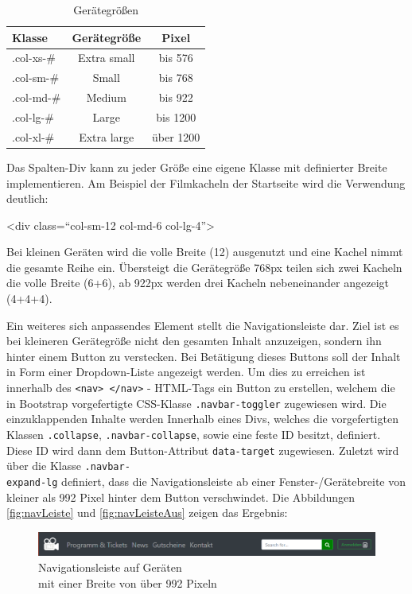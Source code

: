 	\begin{table}[H]
		\centering
		\begin{tabular}{p{} | c | c }
			\textbf{Klasse} & \textbf{Gerätegröße} & \textbf{Pixel} \\\toprule
			.col-xs-\# &  Extra small &  bis 576 \\
			.col-sm-\# &  Small &  bis 768  \\
			.col-md-\# &  Medium &  bis 922  \\
			.col-lg-\# &  Large &  bis 1200  \\
			.col-xl-\# &  Extra large &  über 1200  \\
		\end{tabular}
		\caption[Gerätegrößen]{\label{tab:gerätegrößen}Gerätegrößen }
	\end{table}
	
	Das Spalten-Div kann zu jeder Größe eine eigene Klasse mit definierter Breite implementieren. Am Beispiel der Filmkacheln der Startseite wird die Verwendung deutlich:
		\begin{center}
			<div class=“col-sm-12 col-md-6 col-lg-4”>
		\end{center}

	Bei kleinen Geräten wird die volle Breite (12) ausgenutzt und eine Kachel nimmt die gesamte Reihe ein. Übersteigt die Gerätegröße 768px teilen sich zwei Kacheln die volle Breite (6+6), ab 922px werden drei Kacheln nebeneinander angezeigt (4+4+4).
	
	Ein weiteres sich anpassendes Element stellt die Navigationsleiste dar. Ziel ist es bei kleineren Gerätegröße nicht den gesamten Inhalt anzuzeigen, sondern ihn hinter einem Button zu verstecken. Bei Betätigung dieses Buttons soll der Inhalt in Form einer Dropdown-Liste angezeigt werden. Um dies zu erreichen ist innerhalb des \texttt{<nav> </nav>} - HTML-Tags ein Button zu erstellen, welchem die in Bootstrap vorgefertigte CSS-Klasse \texttt{.navbar-toggler} zugewiesen wird. Die einzuklappenden Inhalte werden Innerhalb eines Divs, welches die vorgefertigten Klassen \texttt{.collapse}, \texttt{.navbar-collapse}, sowie eine feste ID besitzt, definiert. Diese ID wird dann dem Button-Attribut \texttt{data-target} zugewiesen. Zuletzt wird über die Klasse \texttt{.navbar-\\expand-lg} definiert, dass die Navigationsleiste ab einer Fenster-/Gerätebreite von kleiner als 992 Pixel hinter dem Button verschwindet. Die Abbildungen \vref{fig:navLeiste} und \vref{fig:navLeisteAus} zeigen das Ergebnis:
	\begin{figure}[H]
		\centering 
		\includegraphics[width=13cm]{img/navLeiste.png}
		\captionsetup{format=hang}
		\caption[Navigationsleiste]{\label{fig:navLeiste} Navigationsleiste auf Geräten\\ mit einer Breite von über 992 Pixeln}
	\end{figure}
	
